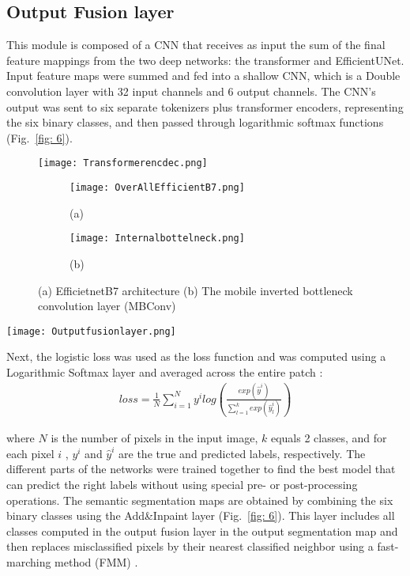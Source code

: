 \documentclass[journal]{IEEEtran}
\begin{document}
\subsection{Output Fusion layer} 
This module is composed of a CNN that receives as input the sum of the final feature mappings from the two deep networks: the transformer and EfficientUNet. Input feature maps were summed and fed into a shallow CNN, which is a Double convolution layer with 32 input channels and 6 output channels.  The CNN’s output was sent to six separate tokenizers plus transformer encoders, representing the six binary classes, and then passed through logarithmic softmax functions (Fig.~\ref{fig: 6}).  
\begin{figure}  
\centering
\texttt{[image: Transformerencdec.png]}
\label{fig: 4}
\end{figure}
\begin{figure}[hptb]
\begin{subfigure}{.18\textwidth}
   \texttt{[image: OverAllEfficientB7.png]}
   \caption{(a)}
\label{fig:g1}
\end{subfigure}\hfill
\begin{subfigure}{.27\textwidth}
   \texttt{[image: Internalbottelneck.png]}
   \caption{(b)}
\label{fig:g2}
\end{subfigure}
\caption{(a) EfficietnetB7 architecture (b) The mobile inverted bottleneck convolution layer (MBConv)}
\label{fig: 5}
\end{figure}
\begin{figure*}  
\centering
\texttt{[image: Outputfusionlayer.png]}
\label{fig: 6}
\end{figure*}
Next, the logistic loss was used as the loss function and was computed using a Logarithmic Softmax layer and averaged across the entire patch \cite{AUDEBERT201820}:
\begin{equation}
\label{eq:5}
\begin{aligned}
loss = \frac{1}{N} {\sum_{i=1}^{N} {y^i log\left( \frac{exp\left(\hat{y}^i\right)}{\sum_{l=1}^{k} {exp\left(\hat{y}_{l}^{i}\right)}} \right)} } 
\end{aligned}
\end{equation}

where $N$ is the number of pixels in the input image, $k$ equals 2 classes, and for each pixel $i$ , $y^i$  and  $\hat{y}^i$ are the true and predicted labels, respectively. The different parts of the networks were trained together to find the best model that can predict the right labels without using special pre- or post-processing operations. 
The semantic segmentation maps are obtained by combining the six binary classes using the Add\&Inpaint layer (Fig.~\ref{fig: 6}). This layer includes all classes computed in the output fusion layer in the output segmentation map and then replaces misclassified pixels by their nearest classified neighbor using a fast-marching method (FMM) \cite{doi:10.1080/10867651.2004.10487596}. 
\end{document}
